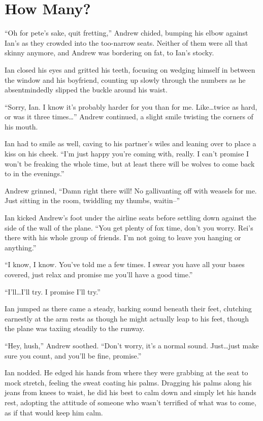 \chapter{How Many?}

``Oh for pete's sake, quit fretting,'' Andrew chided, bumping his elbow against Ian's as they crowded into the too-narrow seats. Neither of them were all that skinny anymore, and Andrew was bordering on fat, to Ian's stocky.

Ian closed his eyes and gritted his teeth, focusing on wedging himself in between the window and his boyfriend, counting up slowly through the numbers as he absentmindedly slipped the buckle around his waist.

``Sorry, Ian. I know it's probably harder for you than for me. Like\ldots{}twice as hard, or was it three times\ldots{}'' Andrew continued, a slight smile twisting the corners of his mouth.

Ian had to smile as well, caving to his partner's wiles and leaning over to place a kiss on his cheek. ``I'm just happy you're coming with, really. I can't promise I won't be freaking the whole time, but at least there will be wolves to come back to in the evenings.''

Andrew grinned, ``Damn right there will! No gallivanting off with weasels for me. Just sitting in the room, twiddling my thumbs, waitin--''

\newpage

Ian kicked Andrew's foot under the airline seats before settling down against the side of the wall of the plane. ``You get plenty of fox time, don't you worry. Rei's there with his whole group of friends. I'm not going to leave you hanging or anything.''

``I know, I know. You've told me a few times. I swear you have all your bases covered, just relax and promise me you'll have a good time.''

``I'll\ldots{}I'll try. I promise I'll try.''

Ian jumped as there came a steady, barking sound beneath their feet, clutching earnestly at the arm rests as though he might actually leap to his feet, though the plane was taxiing steadily to the runway.

``Hey, hush,'' Andrew soothed. ``Don't worry, it's a normal sound. Just\ldots{}just make sure you count, and you'll be fine, promise.''

Ian nodded. He edged his hands from where they were grabbing at the seat to mock stretch, feeling the sweat coating his palms. Dragging his palms along his jeans from knees to waist, he did his best to calm down and simply let his hands rest, adopting the attitude of someone who wasn't terrified of what was to come, as if that would keep him calm.

